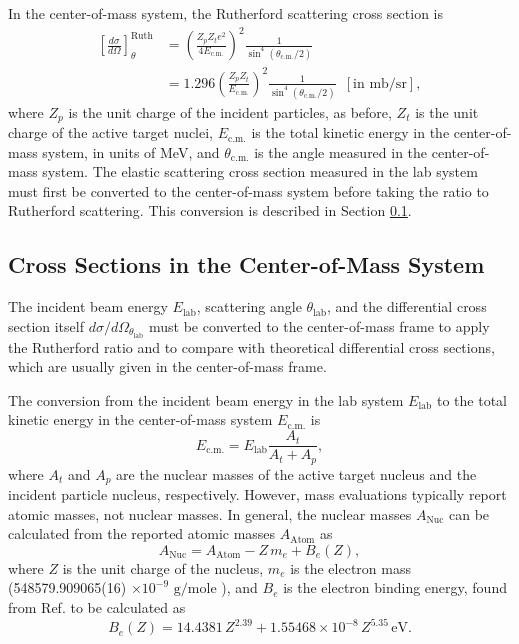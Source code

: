 In the center-of-mass system, the Rutherford scattering cross section is \cite{Iliadis2015}
\begin{align}
\left[ \frac{d\sigma}{d\Omega} \right]^{\mathrm{Ruth}}_{\theta} &= \left( \frac{Z_{p}Z_{t}e^{2}}{4E_{\mathrm{c.m.}}} \right)^{2} \frac{1}{\sin^{4}(\theta_{\mathrm{c.m.}}/2)} \nonumber \\
&= 1.296 \left( \frac{Z_{p}Z_{t}}{E_{\mathrm{c.m.}}} \right)^{2} \frac{1}{\sin^{4}(\theta_{\mathrm{c.m.}}/2)} \, \, \, [\mathrm{in} \, \, \mathrm{mb}/\mathrm{sr}],
\end{align}
where $Z_{p}$ is the unit charge of the incident particles, as before, $Z_{t}$ is the unit charge of the active target nuclei, $E_{\mathrm{c.m.}}$ is the total kinetic energy in the center-of-mass system, in units of MeV, and $\theta_{\mathrm{c.m.}}$ is the angle measured in the center-of-mass system. The elastic scattering cross section measured in the lab system must first be converted to the center-of-mass system before taking the ratio to Rutherford scattering. This conversion is described in Section \ref{subsec:lab_to_cm}.

\subsection{Cross Sections in the Center-of-Mass System} \label{subsec:lab_to_cm}

The incident beam energy $E_{\mathrm{lab}}$, scattering angle $\theta_{\mathrm{lab}}$, and the differential cross section itself $d\sigma/d\Omega_{\theta_{\mathrm{lab}}}$ must be converted to the center-of-mass frame to apply the Rutherford ratio and to compare with theoretical differential cross sections, which are usually given in the center-of-mass frame.

The conversion from the incident beam energy in the lab system $E_{\mathrm{lab}}$ to the total kinetic energy in the center-of-mass system $E_{\mathrm{c.m.}}$ is \cite{Iliadis2015}
\begin{equation}
E_{\mathrm{c.m.}} = E_{\mathrm{lab}} \frac{A_{t}}{A_{t} + A_{p}},
\end{equation}
where $A_{t}$ and $A_{p}$ are the nuclear masses of the active target nucleus and the incident particle nucleus, respectively. However, mass evaluations typically report atomic masses, not nuclear masses. In general, the nuclear masses $A_{\mathrm{Nuc}}$ can be calculated from the reported atomic masses $A_{\mathrm{Atom}}$ as \cite{Wang2021}
\begin{equation}
A_{\mathrm{Nuc}} = A_{\mathrm{Atom}} - Z \, m_{e} + B_{e}(Z),
\end{equation}
where $Z$ is the unit charge of the nucleus, $m_{e}$ is the electron mass  (548579.909065(16) $\times 10^{-9}$ $\mathrm{g}/\mathrm{mole}$ \cite{Huang2021}), and $B_{e}$ is the electron binding energy, found from Ref. \cite{Huang2021} to be calculated as
\begin{equation}
B_{e}(Z) = 14.4381 \, Z^{2.39} + 1.55468 \times 10^{-8} \, Z^{5.35} \, \mathrm{eV}.
\end{equation} 

